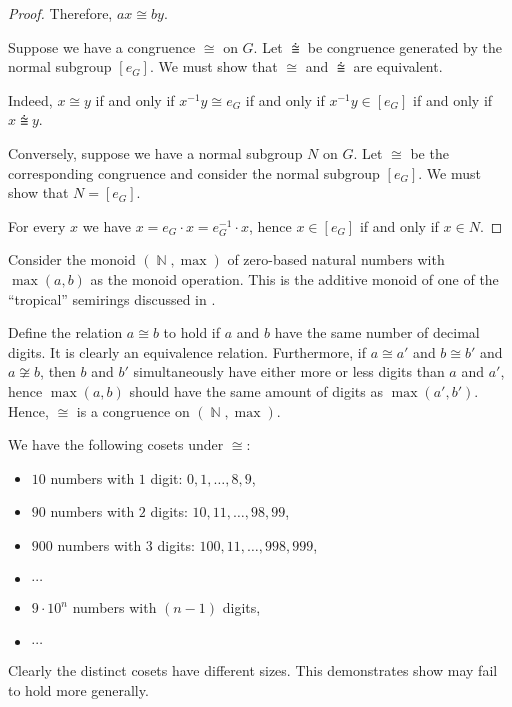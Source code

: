 \begin{proof}
  Therefore, \( ax \cong by \).


   Suppose we have a congruence \( {\cong} \) on \( G \). Let \( {\congdot} \) be congruence generated by the normal subgroup \( [e_G] \). We must show that \( {\cong} \) and \( {\congdot} \) are equivalent.

  Indeed, \( x \cong y \) if and only if \( x^{-1} y \cong e_G \) if and only if \( x^{-1} y \in [e_G] \) if and only if \( x \congdot y \).

   Conversely, suppose we have a normal subgroup \( N \) on \( G \). Let \( {\cong} \) be the corresponding congruence and consider the normal subgroup \( [e_G] \). We must show that \( N = [e_G] \).

  For every \( x \) we have \( x = e_G \cdot x = e_G^{-1} \cdot x \), hence \( x \in [e_G] \) if and only if \( x \in N \).
\end{proof}

\begin{example}\label{ex:congruence_with_cosets_of_different_cardinality}
  Consider the monoid \( (\BbbN, \max) \) of zero-based natural numbers with \( \max(a, b) \) as the monoid operation. This is the additive monoid of one of the \enquote{tropical} semirings discussed in .

  Define the relation \( a \cong b \) to hold if \( a \) and \( b \) have the same number of decimal digits. It is clearly an equivalence relation. Furthermore, if \( a \cong a' \) and \( b \cong b' \) and \( a \not\cong b \), then \( b \) and \( b' \) simultaneously have either more or less digits than \( a \) and \( a' \), hence \( \max(a, b) \) should have the same amount of digits as \( \max(a', b') \). Hence, \( {\cong} \) is a congruence on \( (\BbbN, \max) \).

  We have the following cosets under \( {\cong} \):
  \begin{itemize}
    \item \( 10 \) numbers with \( 1 \) digit: \( 0, 1, \ldots, 8, 9 \),
    \item \( 90 \) numbers with \( 2 \) digits: \( 10, 11, \ldots, 98, 99 \),
    \item \( 900 \) numbers with \( 3 \) digits: \( 100, 11, \ldots, 998, 999 \),
    \item \( \cdots \)
    \item \( 9 \cdot 10^n \) numbers with \( (n - 1) \) digits,
    \item \( \cdots \)
  \end{itemize}

  Clearly the distinct cosets have different sizes. This demonstrates show  may fail to hold more generally.
\end{example}

